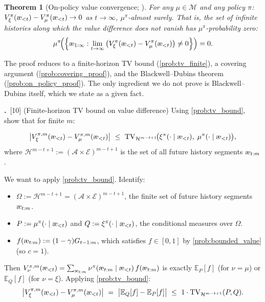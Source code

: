 \documentclass[fontsize=11pt, parskip=half]{scrartcl}
\newtheorem{theorem}{Theorem}[section]
\theoremstyle{definition}
\newenvironment{solution}{%
    \begin{tcolorbox}[colback=black!5!white, colframe=black!50!white,
      title={\textbf{Solution}}, fonttitle=\normalfont, breakable]
  }{\end{tcolorbox}}
\newenvironment{solution}{\expandafter\comment}{\expandafter\endcomment}
\newcommand{\mysubsection}[2]{\par\medskip\noindent\refstepcounter{subsection}\textbf{\thesubsection.}~#2\par\smallskip}
\newcommand{\cA}{\mathcal{A}}
\newcommand{\cE}{\mathcal{E}}
\newcommand{\cH}{\mathcal{H}}
\newcommand{\cM}{\mathcal{M}}
\newcommand{\Ex}{\mathbb{E}}
\newcommand{\TV}[1][]{\mathrm{TV}_{#1}}
\newcommand{\aes}{\textnormal{\ae}}
\begin{document}
\begin{theorem}[On-policy value convergence; {\cite[Theorem 7.3.1]{Hutter:24uaibook2}}]\label{thm:on_policy}
For any $\mu \in \cM$ and any policy $\pi$:
$V_\xi^\pi(\aes_{<t}) - V_\mu^\pi(\aes_{<t}) \to 0$ as $t \to \infty$, $\mu^\pi$-almost surely.
That is, the set of infinite histories along which the value difference does not vanish has $\mu^\pi$-probability zero:
\[
    \mu^\pi\!\Big(\Big\{\aes_{1:\infty} : \lim_{t \to \infty} \big(V_\xi^\pi(\aes_{<t}) - V_\mu^\pi(\aes_{<t})\big) \neq 0\Big\}\Big) = 0.
\]
\end{theorem}

The proof reduces to a finite-horizon TV bound (\cref{prob:tv_finite}), a covering argument (\cref{prob:covering_proof}), and the Blackwell--Dubins theorem (\cref{prob:on_policy_proof}).
The only ingredient we do not prove is Blackwell--Dubins itself, which we state as a given fact.

\mysubsection{1}{[10] (Finite-horizon TV bound on value difference) \label{prob:tv_finite}
Using \cref{prob:tv_bound}, show that for finite $m$:}
\[
    \big|V_\xi^{\pi,m}(\aes_{<t}) - V_\mu^{\pi,m}(\aes_{<t})\big|
    ~\leq~ \TV[\cH^{m-t+1}]\!\big(\xi^\pi(\cdot \mid \aes_{<t}),\; \mu^\pi(\cdot \mid \aes_{<t})\big),
\]
where $\cH^{m-t+1} := (\cA \times \cE)^{m-t+1}$ is the set of all future history segments $\aes_{t:m}$.

\begin{solution}
We want to apply \cref{prob:tv_bound}. Identify:
\begin{itemize}\itemsep=2pt
    \item $\Omega := \cH^{m-t+1} = (\cA \times \cE)^{m-t+1}$, the finite set of future history segments $\aes_{t:m}$.
    \item $P := \mu^\pi(\cdot \mid \aes_{<t})$ and $Q := \xi^\pi(\cdot \mid \aes_{<t})$, the conditional measures over $\Omega$.
    \item $f(\aes_{t:m}) := (1-\gamma)G_{t-1:m}$, which satisfies $f \in [0,1]$ by \cref{prob:bounded_value} (so $c = 1$).
\end{itemize}
Then $V_\nu^{\pi,m}(\aes_{<t}) = \sum_{\aes_{t:m}} \nu^\pi(\aes_{t:m} \mid \aes_{<t})\, f(\aes_{t:m})$ is exactly $\Ex_P[f]$ (for $\nu = \mu$) or $\Ex_Q[f]$ (for $\nu = \xi$).
Applying \cref{prob:tv_bound}:
\[
    \big|V_\xi^{\pi,m}(\aes_{<t}) - V_\mu^{\pi,m}(\aes_{<t})\big|
    ~=~ \big|\Ex_Q[f] - \Ex_P[f]\big|
    ~\leq~ 1 \cdot \TV[\cH^{m-t+1}](P, Q).
\]
\end{solution}
\end{document}
